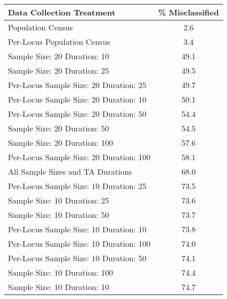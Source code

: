 \begin{tabular}{|l|c|}
  \hline
Data Collection Treatment & \% Misclassified \\ 
  \hline
Population Census & 2.6 \\ 
  Per-Locus Population Census & 3.4 \\ 
  Sample Size:  20  Duration:  10 & 49.1 \\ 
  Sample Size:  20  Duration:  25 & 49.5 \\ 
  Per-Locus Sample Size:  20  Duration:  25 & 49.7 \\ 
  Per-Locus Sample Size:  20  Duration:  10 & 50.1 \\ 
  Per-Locus Sample Size:  20  Duration:  50 & 54.4 \\ 
  Sample Size:  20  Duration:  50 & 54.5 \\ 
  Sample Size:  20  Duration:  100 & 57.6 \\ 
  Per-Locus Sample Size:  20  Duration:  100 & 58.1 \\ 
  All Sample Sizes and TA Durations & 68.0 \\ 
  Per-Locus Sample Size:  10  Duration:  25 & 73.5 \\ 
  Sample Size:  10  Duration:  25 & 73.6 \\ 
  Sample Size:  10  Duration:  50 & 73.7 \\ 
  Per-Locus Sample Size:  10  Duration:  10 & 73.8 \\ 
  Per-Locus Sample Size:  10  Duration:  100 & 74.0 \\ 
  Per-Locus Sample Size:  10  Duration:  50 & 74.1 \\ 
  Sample Size:  10  Duration:  100 & 74.4 \\ 
  Sample Size:  10  Duration:  10 & 74.7 \\ 
   \hline
\end{tabular}
